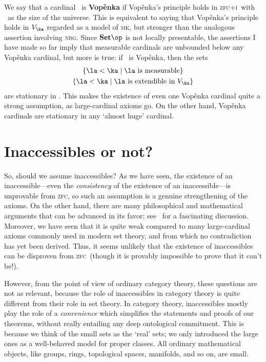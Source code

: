 \documentclass[12pt]{amsart}
\newcommand{\Set}{\ensuremath{\mathbf{Set}}}
\def\zfc{\textsc{zfc}}
\def\zfci{\textsc{zfc+i}}
\def\nbg{\textsc{nbg}}
\def\mk{\textsc{mk}}
\begin{document}
We say that a cardinal \ka\ is \textbf{Vop\v{e}nka} if {Vop\v{e}nka's
  principle} holds in \zfci\ with \ka\ as the size of the universe.
This is equivalent to saying that {Vop\v{e}nka's principle} holds in
$V_\ka$ regarded as a model of \mk, but stronger than the analogous
assertion involving \nbg.  Since $\Set\op$ is not locally presentable,
the assertions I have made so far imply that measurable cardinals are
unbounded below any Vop\v{e}nka cardinal, but more is true: if \ka\ is
Vop\v{e}nka, then the sets
\begin{gather*}
  \{\la<\ka \mid \la \text{ is measurable}\}\\
  \{\la<\ka \mid \la \text{ is extendible in } V_\ka\}
\end{gather*}
are stationary in \ka.  This makes the existence of even one
Vop\v{e}nka cardinal quite a strong assumption, as large-cardinal
axioms go.  On the other hand, Vop\v{e}nka cardinals are stationary in
any `almost huge' cardinal.


\section{Inaccessibles or not?}
\label{sec:phil-inacc}

So, should we assume inaccessibles?  As we have seen, the existence of
an inaccessible---even the \emph{consistency} of the existence of an
inaccessible---is unprovable from \zfc, so such an assumption is a
genuine strengthening of the axioms.  On the other hand, there are
many philosophical and mathematical arguments that can be advanced in
its favor; see~\cite{believing-axioms-i} for a fascinating discussion.
Moreover, we have seen that it is quite weak compared to many
large-cardinal axioms commonly used in modern set theory, and from
which no contradiction has yet been derived.  Thus, it seems unlikely
that the existence of inaccessibles can be disproven from \zfc\
(though it is provably impossible to prove that it can't be!).

However, from the point of view of ordinary category theory, these
questions are not as relevant, because the role of inaccessibles in
category theory is quite different from their role in set theory.  In
category theory, inaccessibles mostly play the role of a
\emph{convenience} which simplifies the statements and proofs of our
theorems, without really entailing any deep ontological commitment.
This is because we think of the small sets as the `real' sets; we only
introduced the large ones as a well-behaved model for proper classes.
All ordinary mathematical objects, like groups, rings, topological
spaces, manifolds, and so on, are small.
\end{document}
